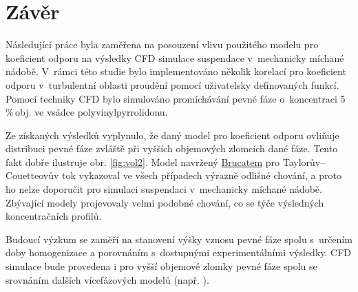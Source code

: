 \chapter{Závěr}
Následující práce byla zaměřena na posouzení vlivu použitého modelu pro koeficient odporu na výsledky CFD simulace suspendace v~mechanicky míchané nádobě. V~rámci této studie bylo implementováno několik korelací pro koeficient odporu v~turbulentní oblasti proudění pomocí uživatelsky definovaných funkcí. Pomocí techniky CFD bylo simulováno promíchávání pevné fáze o~koncentraci 5\,\%\,obj. ve vsádce polyvinylpyrrolidonu.

Ze získaných výsledků vyplynulo, že daný model pro koeficient odporu ovliňuje distribuci pevné fáze zvláště při vyšších objemových zlomcích dané fáze. Tento fakt dobře ilustruje obr. \ref{fig:vol2}. Model navržený \hyperlink{hyp:cds}{Brucatem} pro Taylorův–Couetteovův tok vykazoval ve všech případech výrazně odlišné chování, a proto ho nelze doporučit pro simulaci suspendaci v~mechanicky míchané nádobě. Zbývající modely projevovaly velmi podobné chování, co se týče výsledných koncentračních profilů. 

Budoucí výzkum se zaměří na stanovení výšky vznosu pevné fáze spolu s~určením doby homogenizace a porovnáním s~dostupnými experimentálními výsledky. CFD simulace bude provedena i pro vyšší objemové zlomky pevné fáze spolu se srovnáním dalších vícefázových modelů (např. ).  
